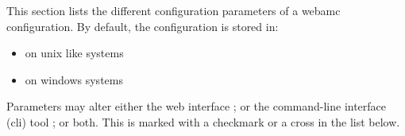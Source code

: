 This section lists the different configuration parameters of a webamc
configuration. By default, the configuration is stored in:
\begin{itemize}
\item {} on unix like
  systems
\item {} on windows systems
\end{itemize}

Parameters may alter either the web interface ; or the command-line
interface (cli) tool ; or both. This is marked with a checkmark or a
cross in the list below.


